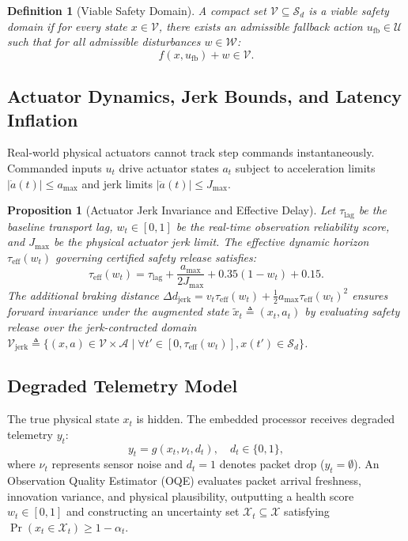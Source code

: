 \documentclass[conference]{IEEEtran}
\newtheorem{definition}{Definition}
\newtheorem{proposition}{Proposition}
\begin{document}
\begin{definition}[Viable Safety Domain]
A compact set $\mathcal{V} \subseteq \mathcal{S}_d$ is a \emph{viable safety domain} if for every state $x \in \mathcal{V}$, there exists an admissible fallback action $u_{\mathrm{fb}} \in \mathcal{U}$ such that for all admissible disturbances $w \in \mathcal{W}$:
\begin{equation}
f(x, u_{\mathrm{fb}}) + w \in \mathcal{V}.
\end{equation}
\end{definition}

\subsection{Actuator Dynamics, Jerk Bounds, and Latency Inflation}
Real-world physical actuators cannot track step commands instantaneously. Commanded inputs $u_t$ drive actuator states $a_t$ subject to acceleration limits $|\dot{a}(t)| \le a_{\max}$ and jerk limits $|\ddot{a}(t)| \le J_{\max}$. 

\begin{proposition}[Actuator Jerk Invariance and Effective Delay]
Let $\tau_{\mathrm{lag}}$ be the baseline transport lag, $w_t \in [0, 1]$ be the real-time observation reliability score, and $J_{\max}$ be the physical actuator jerk limit. The effective dynamic horizon $\tau_{\mathrm{eff}}(w_t)$ governing certified safety release satisfies:
\begin{equation}
\tau_{\mathrm{eff}}(w_t) = \tau_{\mathrm{lag}} + \frac{a_{\max}}{2 J_{\max}} + 0.35(1 - w_t) + 0.15.
\end{equation}
The additional braking distance $\Delta d_{\mathrm{jerk}} = v_t \tau_{\mathrm{eff}}(w_t) + \frac{1}{2} a_{\max} \tau_{\mathrm{eff}}(w_t)^2$ ensures forward invariance under the augmented state $\tilde{x}_t \triangleq (x_t, a_t)$ by evaluating safety release over the jerk-contracted domain $\mathcal{V}_{\mathrm{jerk}} \triangleq \{ (x, a) \in \mathcal{V} \times \mathcal{A} \mid \forall t' \in [0, \tau_{\mathrm{eff}}(w_t)], x(t') \in \mathcal{S}_d \}$.
\end{proposition}

\subsection{Degraded Telemetry Model}
The true physical state $x_t$ is hidden. The embedded processor receives degraded telemetry $y_t$:
\begin{equation}
y_t = g(x_t, \nu_t, d_t), \quad d_t \in \{0, 1\},
\end{equation}
where $\nu_t$ represents sensor noise and $d_t = 1$ denotes packet drop ($y_t = \emptyset$). An Observation Quality Estimator (OQE) evaluates packet arrival freshness, innovation variance, and physical plausibility, outputting a health score $w_t \in [0, 1]$ and constructing an uncertainty set $\mathcal{X}_t \subseteq \mathcal{X}$ satisfying $\Pr(x_t \in \mathcal{X}_t) \ge 1 - \alpha_t$.
\end{document}
